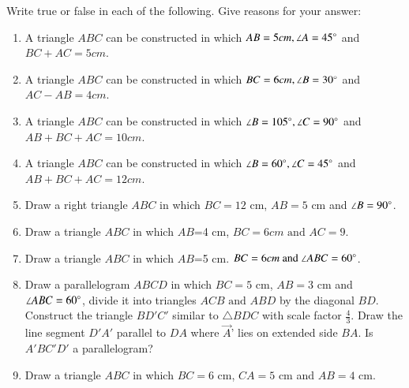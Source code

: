 Write true or false in each of the following. Give reasons for your answer:
\begin{enumerate}[label=\thesection.\arabic*,ref=\thesection.\theenumi,resume*]
\item A triangle $ABC$ can be constructed in which $AB = 5cm, \angle A =45\degree$ and $BC + AC = 5cm$.
\item A triangle $ABC$ can be constructed in which $BC = 6cm, \angle B =30\degree$ and $AC - AB=4cm$.
\item A triangle $ABC$ can be constructed in which $\angle B =105\degree,\angle C =90\degree$ and $AB + BC + AC = 10cm$.        
\item A triangle $ABC$ can be constructed in which $\angle B =60\degree, \angle C =45 \degree$ and $AB + BC + AC = 12cm$.           
\item Draw a right triangle ${ABC}$ in which $BC=12$ cm, $AB=5$ cm and $\angle{B}=90\degree$.
\item Draw a triangle ${ABC}$ in which $AB$=4 cm, $BC=6 cm\text{ and }AC=9$. 
\item Draw a triangle ${ABC}$ in which $AB$=5 cm. $BC=6 cm\text{ and }\angle {ABC}=60\degree$. 
\item Draw a parallelogram ${ABCD}$ in which $BC=5$ cm, $AB=3$ cm and $\angle{ABC}=60\degree$, divide it into triangles ${ACB}\text{ and }{ABD}$ by the diagonal $BD$. 
Construct the triangle $BD'C'$ similar to $\triangle{BDC}$ with scale factor $\frac{4}{3}$. Draw the line segment $D'A'$ parallel to $DA$ where $\vec{A}$' lies on extended side $BA$. Is $A'BC'D'$ a parallelogram? 
\item Draw a triangle ${ABC}$ in which $BC=6$ cm, $CA=5$ cm and $AB=4$ cm. 
\end{enumerate}
